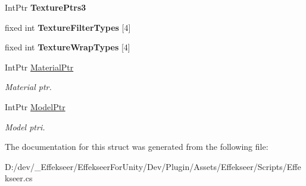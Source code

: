 \begin{DoxyCompactItemize}
\item 
\hypertarget{struct_effekseer_1_1_plugin_1_1_unity_render_parameter_afedf4fb0b43f571c09ede83a223f846e}{Int\-Ptr {\bfseries Texture\-Ptrs3}}\label{struct_effekseer_1_1_plugin_1_1_unity_render_parameter_afedf4fb0b43f571c09ede83a223f846e}

\item 
\hypertarget{struct_effekseer_1_1_plugin_1_1_unity_render_parameter_a5e9dcfc2dc90e08a42390702da8bdebc}{fixed int {\bfseries Texture\-Filter\-Types} \mbox{[}4\mbox{]}}\label{struct_effekseer_1_1_plugin_1_1_unity_render_parameter_a5e9dcfc2dc90e08a42390702da8bdebc}

\item 
\hypertarget{struct_effekseer_1_1_plugin_1_1_unity_render_parameter_aaf3732c6a6a2200af3164d628f58c22c}{fixed int {\bfseries Texture\-Wrap\-Types} \mbox{[}4\mbox{]}}\label{struct_effekseer_1_1_plugin_1_1_unity_render_parameter_aaf3732c6a6a2200af3164d628f58c22c}

\item 
\hypertarget{struct_effekseer_1_1_plugin_1_1_unity_render_parameter_a40875ca69d2b589644ca728aae9baea9}{Int\-Ptr \hyperlink{struct_effekseer_1_1_plugin_1_1_unity_render_parameter_a40875ca69d2b589644ca728aae9baea9}{Material\-Ptr}}\label{struct_effekseer_1_1_plugin_1_1_unity_render_parameter_a40875ca69d2b589644ca728aae9baea9}

\begin{DoxyCompactList}\small\item\em Material ptr. \end{DoxyCompactList}\item 
\hypertarget{struct_effekseer_1_1_plugin_1_1_unity_render_parameter_a56b941542353275011b236b01987a82f}{Int\-Ptr \hyperlink{struct_effekseer_1_1_plugin_1_1_unity_render_parameter_a56b941542353275011b236b01987a82f}{Model\-Ptr}}\label{struct_effekseer_1_1_plugin_1_1_unity_render_parameter_a56b941542353275011b236b01987a82f}

\begin{DoxyCompactList}\small\item\em Model ptri. \end{DoxyCompactList}\end{DoxyCompactItemize}


The documentation for this struct was generated from the following file\-:\begin{DoxyCompactItemize}
\item 
D\-:/dev/\-\_\-\-Effekseer/\-Effekseer\-For\-Unity/\-Dev/\-Plugin/\-Assets/\-Effekseer/\-Scripts/Effekseer.\-cs\end{DoxyCompactItemize}
